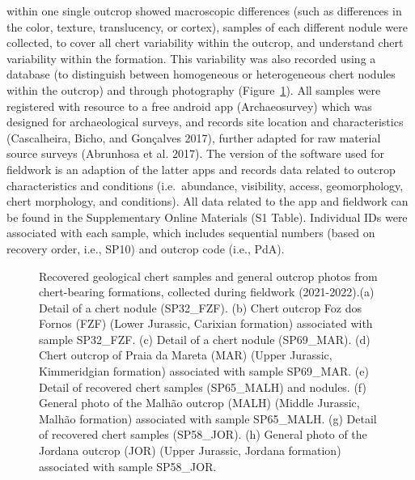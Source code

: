 \documentclass[
  a4paper,
  DIV=11,
  numbers=noendperiod]{scrreprt}
\begin{document}
within one single outcrop showed macroscopic differences (such as
differences in the color, texture, translucency, or cortex), samples of
each different nodule were collected, to cover all chert variability
within the outcrop, and understand chert variability within the
formation. This variability was also recorded using a database (to
distinguish between homogeneous or heterogeneous chert nodules within
the outcrop) and through photography
(Figure~\ref{fig-frames-fieldphoto}). All samples were registered with
resource to a free android app (Archaeosurvey) which was designed for
archaeological surveys, and records site location and characteristics
(Cascalheira, Bicho, and Gonçalves 2017), further adapted for raw
material source surveys (Abrunhosa et al. 2017). The version of the
software used for fieldwork is an adaption of the latter apps and
records data related to outcrop characteristics and conditions
(i.e.~abundance, visibility, access, geomorphology, chert morphology,
and conditions). All data related to the app and fieldwork can be found
in the Supplementary Online Materials (S1 Table). Individual IDs were
associated with each sample, which includes sequential numbers (based on
recovery order, i.e., SP10) and outcrop code (i.e., PdA).

\begin{figure}


\caption{\label{fig-frames-fieldphoto}Recovered geological chert samples
and general outcrop photos from chert-bearing formations, collected
during fieldwork (2021-2022).(a) Detail of a chert nodule (SP32\_FZF).
(b) Chert outcrop Foz dos Fornos (FZF) (Lower Jurassic, Carixian
formation) associated with sample SP32\_FZF. (c) Detail of a chert
nodule (SP69\_MAR). (d) Chert outcrop of Praia da Mareta (MAR) (Upper
Jurassic, Kimmeridgian formation) associated with sample SP69\_MAR. (e)
Detail of recovered chert samples (SP65\_MALH) and nodules. (f) General
photo of the Malhão outcrop (MALH) (Middle Jurassic, Malhão formation)
associated with sample SP65\_MALH. (g) Detail of recovered chert samples
(SP58\_JOR). (h) General photo of the Jordana outcrop (JOR) (Upper
Jurassic, Jordana formation) associated with sample SP58\_JOR.}

\end{figure}%
\end{document}

